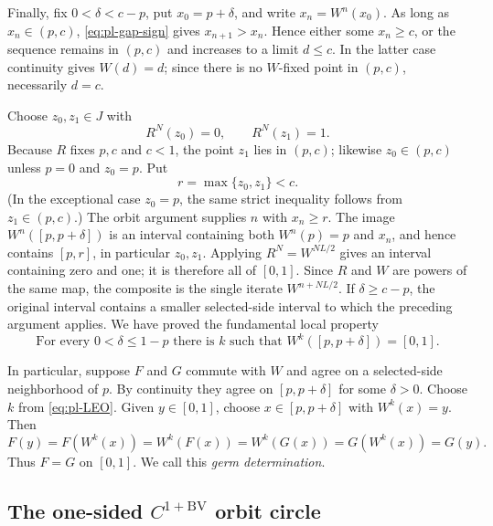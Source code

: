 \documentclass[11pt]{article}
\theoremstyle{definition}
\theoremstyle{remark}
\newcommand{\I}{[0,1]}
\begin{document}
Finally, fix $0<\delta<c-p$, put $x_0=p+\delta$, and write
$x_n=W^n(x_0)$.  As long as $x_n\in(p,c)$,
\eqref{eq:pl-gap-sign} gives $x_{n+1}>x_n$.  Hence either some
$x_n\geq c$, or the sequence remains in $(p,c)$ and increases to a limit
$d\leq c$.  In the latter case continuity gives $W(d)=d$; since there is no
$W$-fixed point in $(p,c)$, necessarily $d=c$.

Choose $z_0,z_1\in J$ with
\[
 R^N(z_0)=0,\qquad R^N(z_1)=1.
\]
Because $R$ fixes $p,c$ and $c<1$, the point $z_1$ lies in $(p,c)$; likewise
$z_0\in(p,c)$ unless $p=0$ and $z_0=p$.  Put
\[
 r=\max\{z_0,z_1\}<c.
\]
(In the exceptional case $z_0=p$, the same strict inequality follows from
$z_1\in(p,c)$.)  The orbit argument supplies $n$ with $x_n\geq r$.
The image $W^n([p,p+\delta])$ is an interval containing both
$W^n(p)=p$ and $x_n$, and hence contains $[p,r]$, in particular $z_0,z_1$.
Applying $R^N=W^{NL/2}$ gives an interval containing zero and one; it is
therefore all of $\I$.  Since $R$ and $W$ are powers of the same map, the
composite is the single iterate $W^{n+NL/2}$.  If
$\delta\geq c-p$, the original interval contains a smaller selected-side
interval to which the preceding argument applies.  We have proved the
fundamental local property
\begin{equation}\label{eq:pl-LEO}
 \boxed{\text{For every }0<\delta\leq1-p\text{ there is }k\text{ such that }
 W^k([p,p+\delta])=\I.}
\end{equation}

In particular, suppose $F$ and $G$ commute with $W$ and agree on a
selected-side neighborhood of $p$.  By continuity they agree on
$[p,p+\delta]$ for some $\delta>0$.  Choose $k$ from
\eqref{eq:pl-LEO}.  Given $y\in\I$, choose
$x\in[p,p+\delta]$ with $W^k(x)=y$.  Then
\[
 F(y)=F(W^k(x))=W^k(F(x))=W^k(G(x))=G(W^k(x))=G(y).
\]
Thus $F=G$ on $\I$.  We call this \emph{germ determination}.

\subsection{The one-sided \texorpdfstring{\(C^{1+\mathrm{BV}}\)}{C1+BV} orbit circle}
\end{document}
